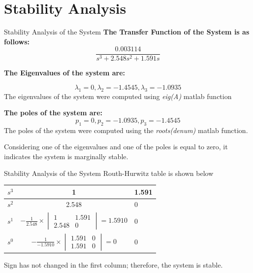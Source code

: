 \documentclass[10pt,compress,mathserif]{beamer}
\begin{document}
\section{Stability Analysis}
\begin{frame}{Stability Analysis of the System}
\textbf{The Transfer Function of the System is as follows:} 
\begin{equation}
\frac{0.003114}{s^3 + 2.548s^2 + 1.591s}
\end{equation}

\textbf{The Eigenvalues of the system are:}

\begin{equation} \lambda_1 = 0,   \lambda_2 = -1.4545,  \lambda_3 = -1.0935 \end{equation}
\vskip10pt
The eigenvalues of the system were computed using \textit{eig(A)} matlab function
\vskip10pt

\textbf{The poles of the system are: }
\begin{equation} p_1 = 0 ,  p_2 = -1.0935 ,  p_3 =-1.4545  \end{equation}
The poles of the system were computed using the \textit{roots(denum)} matlab function. 

\vskip10pt
Considering one of the eigenvalues and one of the poles is equal to zero, it indicates the system is marginally stable. 
\end{frame}

\begin{frame}{Stability Analysis of the System}
Routh-Hurwitz table is shown below
\begin{table}[h] \begin{center}
\begin{tabular}{|l|c|l|} \hline
$s^3$  & 1 & 1.591\\ \hline
$s^2$ & 2.548 & 0 \\ \hline
$s^1$  & $-\frac{1}{2.548}\times\begin{vmatrix} 1 & 1.591\\ 2.548 & 0 \end{vmatrix}=1.5910$ & 0 \\ \hline
$s^0$  & $-\frac{1}{-1.5910}\times\begin{vmatrix} 1.591 & 0\\ 1.591 & 0 \end{vmatrix}=0$ & 0 \\ \hline
\end{tabular} \end{center}
\end{table}

Sign has not changed in the first column; therefore, the system is stable. 


\end{frame}
\end{document}
